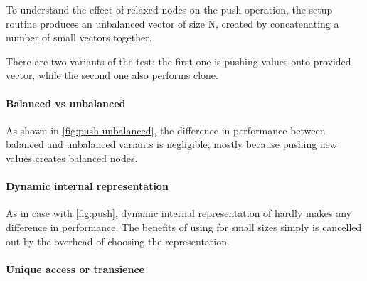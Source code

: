 \begin{figure}[t]
\end{figure}

To understand the effect of relaxed nodes on the push operation, the setup routine produces an unbalanced vector of size N, created by concatenating a number of small vectors together. 

There are two variants of the test: the first one is pushing values onto provided vector, while the second one also performs clone. 

\paragraph{Balanced vs unbalanced} As shown in \ref{fig:push-unbalanced}, the difference in performance between balanced and unbalanced variants is negligible, mostly because pushing new values creates balanced nodes. 

\paragraph{Dynamic internal representation}
As in case with \ref{fig:push}, dynamic internal representation of \pvec{} hardly makes any difference in performance. The benefits of using \stdvec{} for small sizes simply is cancelled out by the overhead of choosing the representation. 

\paragraph{Unique access or transience}

